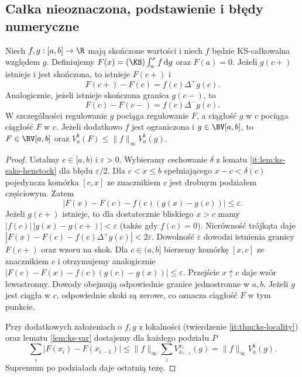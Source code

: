 \subsection*{Całka nieoznaczona, podstawienie i błędy numeryczne}
\begin{twierdzenie}
\label{tw:ks-primitive}
Niech $f,g:[a,b]\to\R$ mają skończone wartości i niech
$f$ będzie KS-całkowalna względem $g$. Definiujemy
$F(x)=(\KS)\int_a^x f\,\mathrm dg$ oraz $F(a)=0$.
Jeżeli $g(c+)$ istnieje i jest skończona, to istnieje
$F(c+)$ i
\[
 F(c+)-F(c)=f(c)\Delta^+g(c).
\]
Analogicznie, jeżeli istnieje skończona granica $g(c-)$, to
\[
 F(c)-F(c-)=f(c)\Delta^-g(c).
\]
W szczególności regulowanie $g$ pociąga regulowanie $F$,
a ciągłość $g$ w $c$ pociąga ciągłość $F$ w $c$.
Jeżeli dodatkowo $f$ jest ograniczona i $g\in\BV[a,b]$, to
$F\in\BV[a,b]$ oraz $V_a^b(F)\le\|f\|_\infty V_a^b(g)$.
\end{twierdzenie}
\begin{proof}
Ustalmy $c\in[a,b)$ i $\varepsilon>0$. Wybieramy cechowanie
$\delta$ z lematu \ref{it:lem:ks-saks-henstock} dla błędu
$\varepsilon/2$. Dla $c<x\le b$ spełniającego
$x-c<\delta(c)$ pojedyncza komórka $[c,x]$ ze znacznikiem
$c$ jest drobnym podziałem częściowym. Zatem
\[
 |F(x)-F(c)-f(c)(g(x)-g(c))|\le\varepsilon.
\]
Jeżeli $g(c+)$ istnieje, to dla dostatecznie bliskiego $x>c$
mamy $|f(c)|\,|g(x)-g(c+)|<\varepsilon$ (także gdy $f(c)=0$).
Nierówność trójkąta daje
$|F(x)-F(c)-f(c)\Delta^+g(c)|<2\varepsilon$.
Dowolność $\varepsilon$ dowodzi istnienia granicy $F(c+)$
oraz wzoru na skok. Dla $c\in(a,b]$ bierzemy komórkę $[x,c]$
ze znacznikiem $c$ i otrzymujemy analogicznie
$|F(c)-F(x)-f(c)(g(c)-g(x))|\le\varepsilon$.
Przejście $x\uparrow c$ daje wzór lewostronny. Dowody
obejmują odpowiednie granice jednostronne w $a,b$.
Jeżeli $g$ jest ciągła w $c$, odpowiednie skoki są zerowe,
co oznacza ciągłość $F$ w tym punkcie.

Przy dodatkowych założeniach o $f,g$ z lokalności
(twierdzenie \ref{it:thm:ks-locality}) oraz lematu
\ref{lem:ks-var} dostajemy dla każdego podziału $P$
\[
 \sum_i|F(x_i)-F(x_{i-1})|
 \le\|f\|_\infty\sum_i V_{x_{i-1}}^{x_i}(g)
 =\|f\|_\infty V_a^b(g).
\]
Supremum po podziałach daje ostatnią tezę.
\end{proof}

